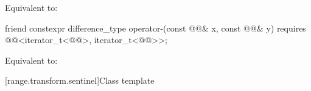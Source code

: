 \begin{itemdescr}
\pnum
\effects
Equivalent to: 
\end{itemdescr}

%
\begin{itemdecl}
friend constexpr difference_type operator-(const @@& x, const @@& y)
  requires @@<iterator_t<@@>, iterator_t<@@>>;
\end{itemdecl}

\begin{itemdescr}
\pnum
\effects
Equivalent to: 
\end{itemdescr}


[range.transform.sentinel]{Class template }

